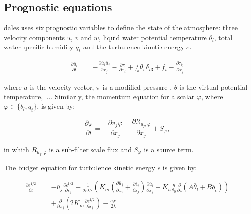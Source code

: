 \subsection{Prognostic equations}
\acrshort{dales} uses six prognostic variables to define the state of the atmosphere: three velocity components $u$, $v$ and $w$, liquid water potential temperature $\theta_l$, total water specific humidity $q_t$ and the turbulence kinetic energy $e$. 

\begin{align}
    \frac{\partial \overline{u}_i}{\partial t} &= - \frac{\partial \overline{u}_i \overline{u}_j}{\partial x_j} - \frac{\partial \pi}{\partial x_i} + \frac{g}{\theta_0}\overline{\theta}_v \delta_{i3} + f_i - \frac{\partial \tau_{ij}}{\partial x_j} \label{eq:momentum_conservation}
\end{align}

where $u$ is the velocity vector, $\pi$ is a modified pressure , $\theta$ is the virtual potential temperature, .... Similarly, the momentum equation for a scalar $\varphi$, where $\varphi \in \{\theta_l, q_t\}$, is given by:

\begin{equation}
    \frac{\partial \overline{\varphi}}{\partial t} = - \frac{\partial \overline{u}_j \overline{\varphi}}{\partial x_j} - \frac{\partial R_{u_j,\varphi}}{\partial x_j} + S_\varphi,
\end{equation}

in which $R_{u_j,\varphi}$ is a sub-filter scale flux and $S_\varphi$ is a source term.

The budget equation for turbulence kinetic energy $e$ is given by:

\begin{equation}
\begin{split}
    \frac{\partial e^{1/2}}{\partial t} = &- \overline{u}_j \frac{\partial e^{1/2}}{\partial x_j} + \frac{1}{2e^{1/2}} \left( K_m \left( \frac{\partial \overline{u}_j}{\partial x_i} + \frac{\partial \overline{u}_i}{\partial x_j} \right) \frac{\partial \overline{u}_i}{\partial x_j} - K_h \frac{g}{\theta_0} \frac{\partial}{\partial z} \left( A \overline{\theta}_l + B \overline{q}_t\right) \right) \\ &+ \frac{\partial}{\partial x_j} \left( 2 K_m \frac{\partial e^{1/2}}{\partial x_j}\right) - \frac{c_{\varepsilon} e}{2 \lambda}
\end{split}
\end{equation}



